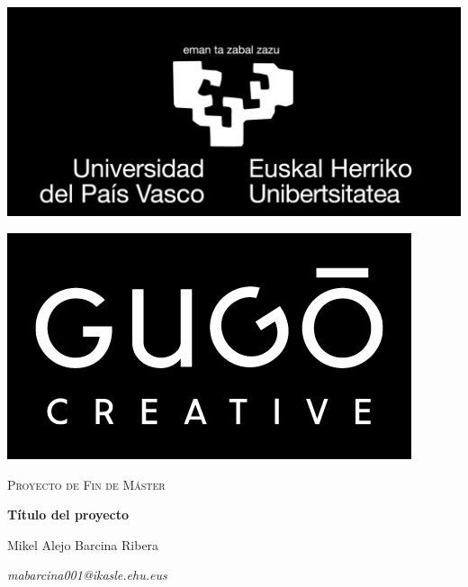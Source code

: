 
\begin{titlepage}

  \pagecolor{black}\afterpage{\nopagecolor}
  \afterpage{\null\thispagestyle{empty}\newpage}

  \color{white}
  \centering

  \includegraphics[scale=0.2]{img/logo_upvehu}\par
  \includegraphics[scale=0.3]{img/logo_gugocreative}\par\vspace{1cm}

  \vspace{3cm}

  {\scshape\Large Proyecto de Fin de Máster \par}

  \vspace{1.5cm}

  {\Huge\bfseries Título del proyecto\par}

  \vfill

  \Large Mikel Alejo Barcina Ribera\par
  {\itshape mabarcina001@ikasle.ehu.eus}

\end{titlepage}
